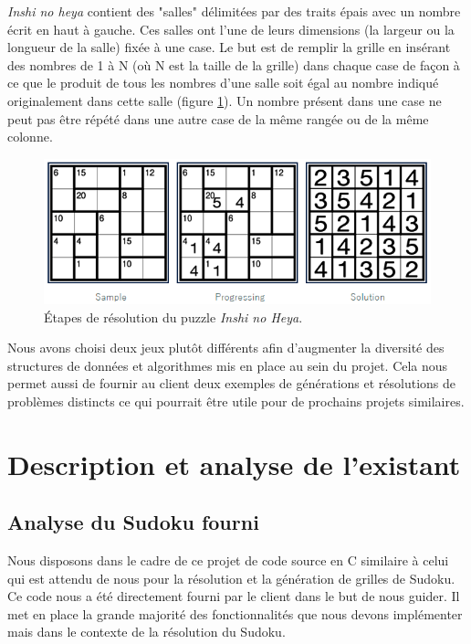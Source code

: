 \documentclass[12pt]{article}
\begin{document}
\textit{Inshi no heya} \cite{NikInshi18} contient des "salles" délimitées par des traits épais avec un nombre écrit en haut à gauche. Ces salles ont l'une de leurs dimensions (la largeur ou la longueur de la salle) fixée à une case. Le but est de remplir la grille en insérant des nombres de 1 à N (où N est la taille de la grille) dans chaque case de façon à ce que le produit de tous les nombres d'une salle soit égal au nombre indiqué originalement dans cette salle (figure \ref{fig:inshi}). Un nombre présent dans une case ne peut pas être répété dans une autre case de la même rangée ou de la même colonne.

\begin{figure}[H]
\caption{Étapes de résolution du puzzle \textit{Inshi no Heya}.}
\label{fig:inshi}
\centering
\includegraphics[width=.85\textwidth]{inshi}
\end{figure}

Nous avons choisi deux jeux plutôt différents afin d'augmenter la diversité des structures de données et algorithmes mis en place au sein du projet. Cela nous permet aussi de fournir au client deux exemples de générations et résolutions de problèmes distincts ce qui pourrait être utile pour de prochains projets similaires.\\


\newpage
\section{Description et analyse de l'existant}

\subsection{Analyse du Sudoku fourni}
Nous disposons dans le cadre de ce projet de code source en C similaire à celui qui est attendu de nous pour la résolution et la génération de grilles de Sudoku. Ce code nous a été directement fourni par le client dans le but de nous guider. Il met en place la grande majorité des fonctionnalités que nous devons implémenter mais dans le contexte de la résolution du Sudoku. 
\end{document}
